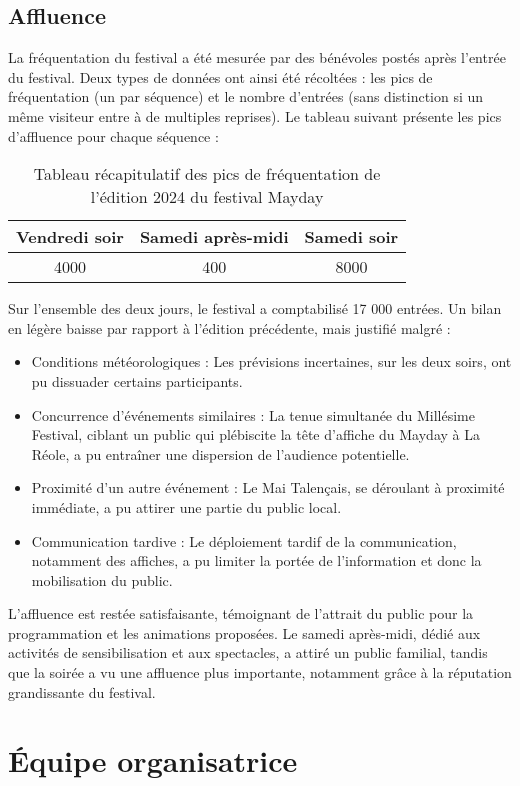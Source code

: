 \documentclass[12pt,a4paper]{report}
\begin{document}
\section{Affluence}
La fréquentation du festival a été mesurée par des bénévoles postés après l'entrée du festival. Deux types de données ont ainsi été récoltées : les pics de fréquentation (un par séquence) et le nombre d'entrées (sans distinction si un même visiteur entre à de multiples reprises). Le tableau suivant présente les pics d'affluence pour chaque séquence :
\begin{table}[h!]
\centering
\begin{tabular}{|c|c|c|}
\hline
Vendredi soir & Samedi après-midi & Samedi soir \\
\hline
4000 & 400 & 8000\\
\hline
\end{tabular}
\caption{Tableau récapitulatif des pics de fréquentation de l'édition 2024 du festival Mayday}
\end{table}

Sur l'ensemble des deux jours, le festival a comptabilisé 17 000 entrées. Un bilan en légère baisse par rapport à l'édition précédente, mais justifié malgré :
\begin{itemize}
\item Conditions météorologiques : Les prévisions incertaines, sur les deux soirs, ont pu dissuader certains participants.
\item Concurrence d'événements similaires : La tenue simultanée du Millésime Festival, ciblant un public qui plébiscite la tête d’affiche du Mayday à La Réole, a pu entraîner une dispersion de l'audience potentielle.
\item Proximité d'un autre événement : Le Mai Talençais, se déroulant à proximité immédiate, a pu attirer une partie du public local.
\item Communication tardive : Le déploiement tardif de la communication, notamment des affiches, a pu limiter la portée de l'information et donc la mobilisation du public.\\
\end{itemize}
L'affluence est restée satisfaisante, témoignant de l'attrait du public pour la programmation  et les animations proposées. Le samedi après-midi, dédié aux activités de sensibilisation et aux spectacles, a attiré un public familial, tandis que la soirée a vu une affluence plus importante, notamment grâce à la réputation grandissante du festival.

\chapter{Équipe organisatrice}
\end{document}
